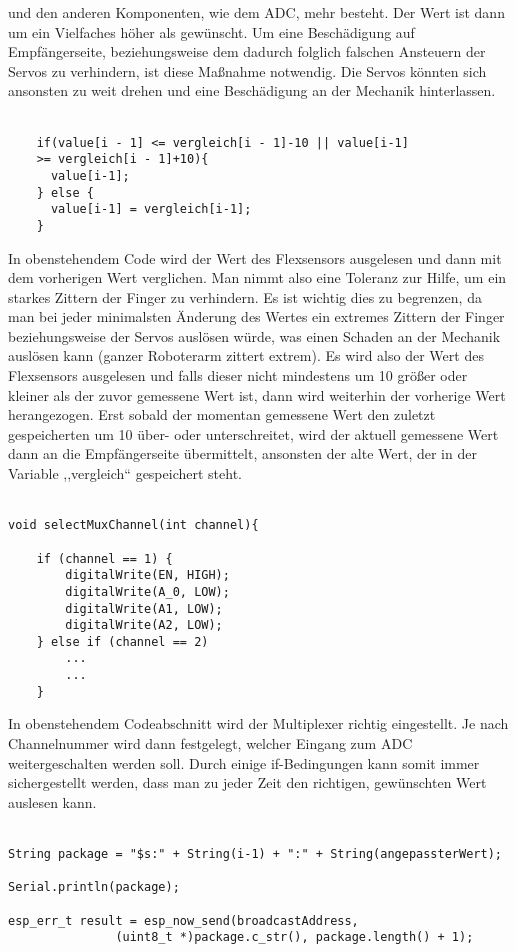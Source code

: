\documentclass[titlepage,12pt,twoside]{article}
\begin{document}
und den anderen Komponenten, wie dem ADC, mehr besteht. Der Wert ist dann um ein 
Vielfaches höher als gewünscht. Um eine Beschädigung auf Empfängerseite, beziehungsweise 
dem dadurch folglich falschen Ansteuern der Servos zu verhindern, ist diese Maßnahme 
notwendig. Die Servos könnten sich ansonsten zu weit drehen und eine Beschädigung an 
der Mechanik hinterlassen. \\
\\
\begin{lstlisting}
    if(value[i - 1] <= vergleich[i - 1]-10 || value[i-1]
	>= vergleich[i - 1]+10){
      value[i-1];
    } else {
      value[i-1] = vergleich[i-1];
    }
\end{lstlisting}
\hfill \break
In obenstehendem Code wird der Wert des Flexsensors ausgelesen und dann mit dem 
vorherigen Wert verglichen. Man nimmt also eine Toleranz zur Hilfe, um ein starkes 
Zittern der Finger zu verhindern. Es ist wichtig dies zu begrenzen, da man bei jeder 
minimalsten Änderung des Wertes ein extremes Zittern der Finger beziehungsweise der 
Servos auslösen würde, was einen Schaden an der Mechanik auslösen kann (ganzer 
Roboterarm zittert extrem). Es wird also der Wert des Flexsensors ausgelesen und falls 
dieser nicht mindestens um 10 größer oder kleiner als der zuvor gemessene Wert ist, dann 
wird weiterhin der vorherige Wert herangezogen. Erst sobald der momentan gemessene Wert 
den zuletzt gespeicherten um 10 über- oder unterschreitet, wird der aktuell gemessene 
Wert dann an die Empfängerseite übermittelt, ansonsten der alte Wert, der in der 
Variable ,,vergleich“ gespeichert steht. \\
\\
\begin{lstlisting}
void selectMuxChannel(int channel){

	if (channel == 1) {
		digitalWrite(EN, HIGH);
		digitalWrite(A_0, LOW);
		digitalWrite(A1, LOW);
		digitalWrite(A2, LOW);
	} else if (channel == 2) 
		...
		...
	}
\end{lstlisting}
\hfill \break
In obenstehendem Codeabschnitt wird der Multiplexer richtig eingestellt. Je nach 
Channelnummer wird dann festgelegt, welcher Eingang zum ADC weitergeschalten werden 
soll. Durch einige if-Bedingungen kann somit immer sichergestellt werden, dass man 
zu jeder Zeit den richtigen, gewünschten Wert auslesen kann. \\
\\
\begin{lstlisting}
String package = "$s:" + String(i-1) + ":" + String(angepassterWert);

Serial.println(package);

esp_err_t result = esp_now_send(broadcastAddress, 
        	   (uint8_t *)package.c_str(), package.length() + 1);
\end{lstlisting}
\end{document}
